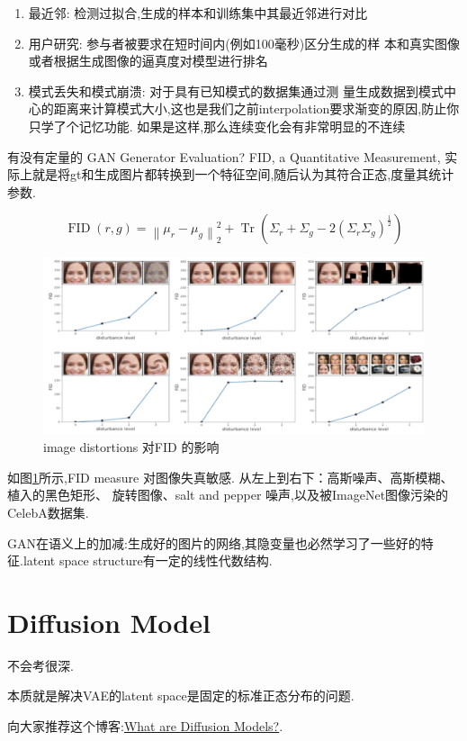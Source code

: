 	\begin{enumerate}
	\item 最近邻: 检测过拟合,生成的样本和训练集中其最近邻进行对比
	\item 用户研究: 参与者被要求在短时间内(例如100毫秒)区分生成的样
	本和真实图像或者根据生成图像的逼真度对模型进行排名 
	\item 模式丢失和模式崩溃: 对于具有已知模式的数据集通过测
	量生成数据到模式中心的距离来计算模式大小,这也是我们之前interpolation要求渐变的原因,防止你只学了个记忆功能.
	如果是这样,那么连续变化会有非常明显的不连续
	\end{enumerate}
	
	有没有定量的 GAN Generator Evaluation?
	FID, a Quantitative Measurement,
	实际上就是将gt和生成图片都转换到一个特征空间,随后认为其符合正态,度量其统计参数.
	
	\begin{equation}
		\operatorname{FID}(r, g)=\left\|\mu_{r}-\mu_{g}\right\|_{2}^{2}+\operatorname{Tr}\left(\Sigma_{r}+\Sigma_{g}-2\left(\Sigma_{r} \Sigma_{g}\right)^{\frac{1}{2}}\right)
	\end{equation}

	\begin{figure}[htbp]
		\centering
		\includegraphics[scale=0.3]{figures/fid.png}
		\caption{image distortions 对FID 的影响}
		\label{fig:fid}
	\end{figure}

	如图\ref{fig:fid}所示,FID measure 对图像失真敏感.
	从左上到右下：高斯噪声、高斯模糊、植入的黑色矩形、
	旋转图像、salt and pepper 噪声,以及被ImageNet图像污染的CelebA数据集.
	
	GAN在语义上的加减:生成好的图片的网络,其隐变量也必然学习了一些好的特征.latent
	space structure有一定的线性代数结构.
	
	\section{Diffusion Model}

	不会考很深.

	本质就是解决VAE的latent space是固定的标准正态分布的问题.

	向大家推荐这个博客:\href{https://lilianweng.github.io/posts/2021-07-11-diffusion-models/}{What are Diffusion Models?}.
